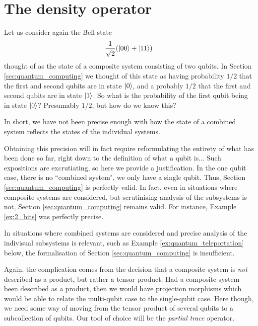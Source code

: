 \documentclass[12pt]{article}
\theoremstyle{plain}
\theoremstyle{definition}
\begin{document}
	\section{The density operator}\label{sec:density_operator}
	Let us consider again the Bell state
	\begin{equation}\label{eq:bell_again}
		\frac{1}{\sqrt{2}}(\ket{00} + \ket{11})
		\end{equation}
	thought of as the state of a composite system consisting of two qubits. In Section \ref{sec:quantum_computing} we thought of this state as having probability $1/2$ that the first and second qubits are in state $\ket{0}$, and a probably $1/2$ that the first and second qubits are in state $\ket{1}$. So what is the probability of the first qubit being in state $\ket{0}$? Presumably $1/2$, but how do we know this?
	
	In short, we have not been precise enough with how the state of a combined system reflects the states of the individual systems.
	
	Obtaining this precision will in fact require reformulating the entirety of what has been done so far, right down to the definition of what a qubit is... Such expositions are excrutiating, so here we provide a justification. In the one qubit case, there is no ``combined system", we only have a single qubit. Thus, Section \ref{sec:quantum_computing} is perfectly valid. In fact, even in situations where composite systems are considered, but scrutinising analysis of the subsystems is not, Section \ref{sec:quantum_computing} remains valid. For instance, Example \ref{ex:2_bits} was perfectly precise.
	
	In situations where combined systems are considered and precise analysis of the indivisual subsystems is relevant, such as Example \ref{ex:quantum_teleportation} below, the formalisation of Section \ref{sec:quantum_computing} is insufficient.
	
	Again, the complication comes from the decision that a composite system is \emph{not} described as a product, but rather a tensor product. Had a composite system been described as a product, then we would have projection morphisms which would be able to relate the multi-qubit case to the single-qubit case. Here though, we need some way of moving from the tensor product of several qubits to a subcollection of qubits. Our tool of choice will be the \emph{partial trace} operator.
	
\end{document}
